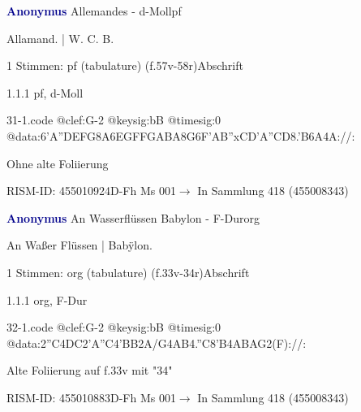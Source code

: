 \documentclass[twocolumn, 12pt]{book}
\begin{document}
\par \vspace{16pt} \textcolor{darkblue}{\textbf{Anonymus  }}\hfillplus{\textbf{[31]}}\newline Allemandes - d-Moll\newline pf
\par \begin{itshape}[f.57v, at left:] Allamand. | W. C. B.\end{itshape} 
\par \textcolor{darkblue}{}  1 Stimmen: pf (tabulature)  (f.57v-58r)\newline Abschrift
\par 1.1.1  pf, d-Moll  
\begin{filecontents*}{31-1.code}
@clef:G-2
@keysig:bB
@timesig:0
@data:6'A{''DEFG}{8A6EG}{FFGA}{BA8G}{6F'AB''xC}{D'A''CD}{8.'B6A}4A://:
\end{filecontents*}
\newline %
\par Ohne alte Foliierung
\par RISM-ID: 455010924\newline D-Fh  Ms 001\newline $\rightarrow$ In Sammlung 418 (455008343)
      
\par \vspace{16pt} \textcolor{darkblue}{\textbf{Anonymus  }}\hfillplus{\textbf{[32]}}\newline An Wasserflüssen Babylon - F-Dur\newline org
\par \begin{itshape}[f.33v, at left:] An Waßer Flüssen | Babÿlon.\end{itshape} 
\par \textcolor{darkblue}{}  1 Stimmen: org (tabulature)  (f.33v-34r)\newline Abschrift
\par 1.1.1  org, F-Dur  
\begin{filecontents*}{32-1.code}
@clef:G-2
@keysig:bB
@timesig:0
@data:2''C4DC2'A''C4'BB2A/G4AB4.''C8'B4ABAG2(F)://:
\end{filecontents*}
\newline %
\par Alte Foliierung auf f.33v mit "34"
\par RISM-ID: 455010883\newline D-Fh  Ms 001\newline $\rightarrow$ In Sammlung 418 (455008343)
      
\end{document}
